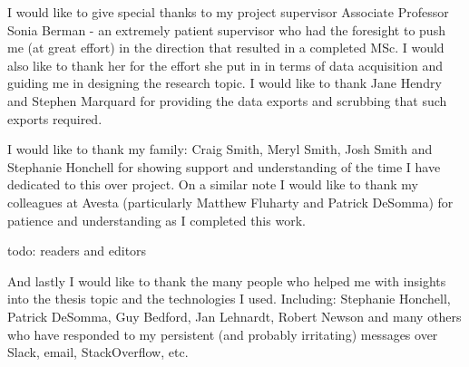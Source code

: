 I would like to give special thanks to my project supervisor Associate Professor Sonia Berman - an extremely patient supervisor who had the foresight to push me (at great effort) in the direction that resulted in a completed MSc. I would also like to thank her for the effort she put in in terms of data acquisition and guiding me in designing the research topic. I would like to thank Jane Hendry and Stephen Marquard for providing the data exports and scrubbing that such exports required.

I would like to thank my family: Craig Smith, Meryl Smith, Josh Smith and Stephanie Honchell for showing support and understanding of the time I have dedicated to this over project. On a similar note I would like to thank my colleagues at Avesta (particularly Matthew Fluharty and Patrick DeSomma) for patience and understanding as I completed this work.

todo: readers and editors

And lastly I would like to thank the many people who helped me with insights into the thesis topic and the technologies I used. Including: Stephanie Honchell, Patrick DeSomma, Guy Bedford, Jan Lehnardt, Robert Newson and many others who have responded to my persistent (and probably irritating) messages over Slack, email, StackOverflow, etc.